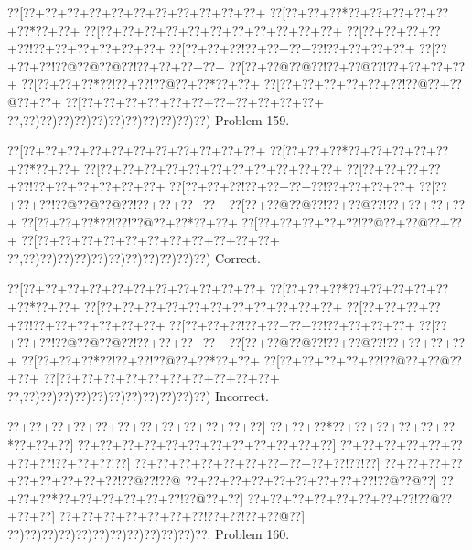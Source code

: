 \documentclass[a5paper]{article}
\begin{document}
\begin{center}
{\goo
\0??[\0??+\0??+\0??+\0??+\0??+\0??+\0??+\0??+\0??+\0??+\0??+
\0??[\0??+\0??+\0??*\0??+\0??+\0??+\0??+\0??+\0??*\0??+\0??+
\0??[\0??+\0??+\0??+\0??+\0??+\0??+\0??+\0??+\0??+\0??+\0??+
\0??[\0??+\0??+\0??+\0??+\0??!\0??+\0??+\0??+\0??+\0??+\0??+
\0??[\0??+\0??+\0??!\0??+\0??+\0??+\0??!\0??+\0??+\0??+\0??+
\0??[\0??+\0??+\0??!\0??@\0??@\0??@\0??!\0??+\0??+\0??+\0??+
\0??[\0??+\0??@\0??@\0??!\0??+\0??@\0??!\0??+\0??+\0??+\0??+
\0??[\0??+\0??+\0??*\0??!\0??+\0??!\0??@\0??+\0??*\0??+\0??+
\0??[\0??+\0??+\0??+\0??+\0??+\0??!\0??@\0??+\0??@\0??+\0??+
\0??[\0??+\0??+\0??+\0??+\0??+\0??+\0??+\0??+\0??+\0??+\0??+
\0??,\0??)\0??)\0??)\0??)\0??)\0??)\0??)\0??)\0??)\0??)\0??)
}
Problem 159.

\end{center}
\begin{center}
{\goo
\0??[\0??+\0??+\0??+\0??+\0??+\0??+\0??+\0??+\0??+\0??+\0??+
\0??[\0??+\0??+\0??*\0??+\0??+\0??+\0??+\0??+\0??*\0??+\0??+
\0??[\0??+\0??+\0??+\0??+\0??+\0??+\0??+\0??+\0??+\0??+\0??+
\0??[\0??+\0??+\0??+\0??+\0??!\0??+\0??+\0??+\0??+\0??+\0??+
\0??[\0??+\0??+\0??!\0??+\0??+\0??+\0??!\0??+\0??+\0??+\0??+
\0??[\0??+\0??+\0??!\0??@\0??@\0??@\0??!\0??+\0??+\0??+\0??+
\0??[\0??+\0??@\0??@\0??!\0??+\0??@\0??!\0??+\0??+\0??+\0??+
\0??[\0??+\0??+\0??*\0??!\0??!\0??@\0??+\0??*\0??+\0??+
\0??[\0??+\0??+\0??+\0??+\0??!\0??@\0??+\0??@\0??+\0??+
\0??[\0??+\0??+\0??+\0??+\0??+\0??+\0??+\0??+\0??+\0??+\0??+
\0??,\0??)\0??)\0??)\0??)\0??)\0??)\0??)\0??)\0??)\0??)\0??)
}
Correct. 

\end{center}
\begin{center}
{\goo
\0??[\0??+\0??+\0??+\0??+\0??+\0??+\0??+\0??+\0??+\0??+\0??+
\0??[\0??+\0??+\0??*\0??+\0??+\0??+\0??+\0??+\0??*\0??+\0??+
\0??[\0??+\0??+\0??+\0??+\0??+\0??+\0??+\0??+\0??+\0??+\0??+
\0??[\0??+\0??+\0??+\0??+\0??!\0??+\0??+\0??+\0??+\0??+\0??+
\0??[\0??+\0??+\0??!\0??+\0??+\0??+\0??!\0??+\0??+\0??+\0??+
\0??[\0??+\0??+\0??!\0??@\0??@\0??@\0??!\0??+\0??+\0??+\0??+
\0??[\0??+\0??@\0??@\0??!\0??+\0??@\0??!\0??+\0??+\0??+\0??+
\0??[\0??+\0??+\0??*\0??!\0??+\0??!\0??@\0??+\0??*\0??+\0??+
\0??[\0??+\0??+\0??+\0??+\0??!\0??@\0??+\0??@\0??+\0??+
\0??[\0??+\0??+\0??+\0??+\0??+\0??+\0??+\0??+\0??+\0??+
\0??,\0??)\0??)\0??)\0??)\0??)\0??)\0??)\0??)\0??)\0??)\0??)
}
Incorrect. 

\end{center}
\newpage
\begin{center}
{\goo
\0??+\0??+\0??+\0??+\0??+\0??+\0??+\0??+\0??+\0??+\0??+\0??]
\0??+\0??+\0??*\0??+\0??+\0??+\0??+\0??+\0??*\0??+\0??+\0??]
\0??+\0??+\0??+\0??+\0??+\0??+\0??+\0??+\0??+\0??+\0??+\0??]
\0??+\0??+\0??+\0??+\0??+\0??+\0??+\0??!\0??+\0??+\0??!\0??]
\0??+\0??+\0??+\0??+\0??+\0??+\0??+\0??+\0??+\0??!\0??!\0??]
\0??+\0??+\0??+\0??+\0??+\0??+\0??+\0??+\0??!\0??@\0??!\0??@
\0??+\0??+\0??+\0??+\0??+\0??+\0??+\0??+\0??!\0??@\0??@\0??]
\0??+\0??+\0??*\0??+\0??+\0??+\0??+\0??+\0??!\0??@\0??+\0??]
\0??+\0??+\0??+\0??+\0??+\0??+\0??+\0??!\0??@\0??+\0??+\0??]
\0??+\0??+\0??+\0??+\0??+\0??+\0??!\0??+\0??!\0??+\0??@\0??]
\0??)\0??)\0??)\0??)\0??)\0??)\0??)\0??)\0??)\0??)\0??)\0??.
}
Problem 160.

\end{center}
\end{document}
